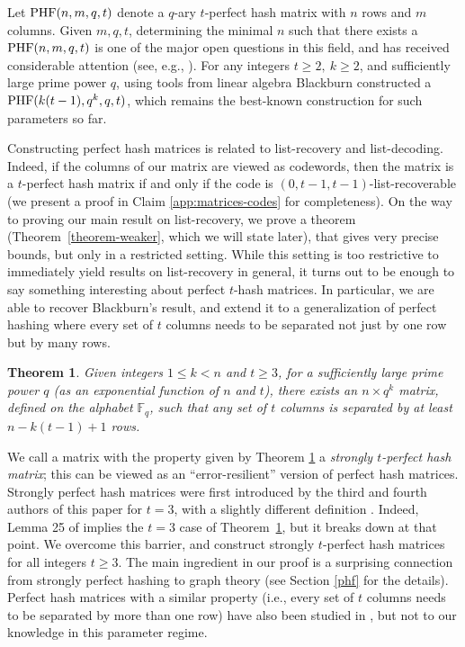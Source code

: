 \documentclass[11pt]{article}
\newtheorem{theorem}{Theorem}[section]
\newcommand\black[1]{{\color{black} #1}}
\begin{document}
Let ${\rm PHF}(n,m,q,t)$ denote a $q$-ary $t$-perfect hash matrix with $n$ rows and $m$ columns. Given $m,q,t$, determining the minimal $n$ such that there exists a ${\rm PHF}(n,m,q,t)$ is one of the major open questions in this field, and has received considerable attention (see, e.g., \cite{Blackburn1998Optimal,blackburn2000perfect,shangguan2016separating}). For any integers $t\ge 2,~k\ge 2$, and sufficiently large prime power $q$, using tools from linear algebra Blackburn \cite{Blackburn1998Optimal} constructed a ${\rm PHF}(k(t-1),q^k,q,t)$, which remains the best-known construction for such parameters so far.

Constructing perfect hash matrices is related to list-recovery and list-decoding. Indeed, if the columns of our matrix are viewed as  codewords, then the matrix is a $t$-perfect hash matrix if and only if the code is $(0, t-1,t-1)$-list-recoverable \black{(we present a proof in Claim \ref{app:matrices-codes} for completeness)}. On the way to proving our main result on list-recovery, we prove a theorem (Theorem~\ref{theorem-weaker}, which we will state later), that gives very precise bounds, but only in a restricted setting.  While this setting is too restrictive to immediately yield results on list-recovery in general, it turns out to be enough to say something interesting about perfect $t$-hash matrices. In particular, we are able to recover Blackburn's result, and extend it to a generalization of perfect hashing where every set of $t$ columns needs to be separated not just by one row but by many rows.

\begin{theorem}\label{perfect-hash-matrix}
Given integers $1\le k<n$ and $t\ge 3$, for a sufficiently large prime power $q$ \black{(as an \black{exponential} function of $n$ and $t$)}, there exists an $n\times q^k$ matrix, defined on the alphabet $\mathbb{F}_q$, such that any set of $t$ columns is separated by at least $n-k(t-1)+1$ rows.
\end{theorem}

We call a matrix with the property given by Theorem \ref{perfect-hash-matrix} a {\it strongly $t$-perfect hash matrix}; this can be viewed as an ``error-resilient'' version of perfect hash matrices.  Strongly perfect hash matrices were first introduced by the third and fourth authors of this paper for $t=3$, with a slightly different definition \cite{shangguan2020degenerate}. Indeed, Lemma 25 of \cite{shangguan2020degenerate} implies the $t=3$ case of Theorem~\ref{perfect-hash-matrix}, but it breaks down at that point. We overcome this barrier, and construct strongly $t$-perfect hash matrices for all integers $t\ge 3$. The main ingredient in our proof is a surprising connection from strongly perfect hashing to graph theory (see Section \ref{phf} for the details).  Perfect hash matrices with a similar property (i.e., every set of $t$ columns needs to be separated by more than one row) have also been studied in \cite{dougherty2019hash}, but not to our knowledge in this parameter regime.
\end{document}
